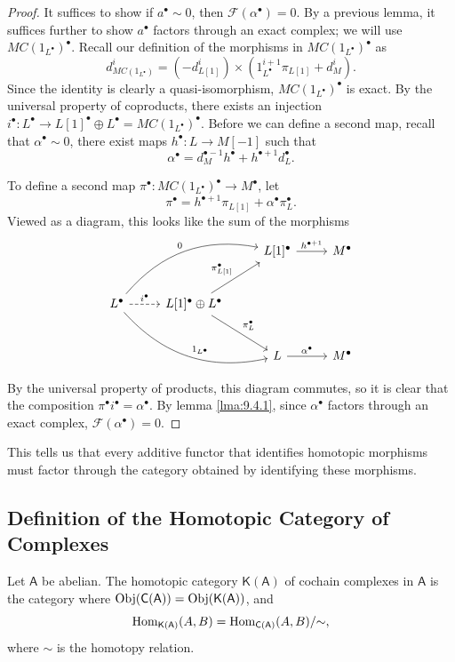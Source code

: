 \begin{proof}
	It suffices to show if $a^{\bullet} \sim 0$, then $\mathscr{F} (\alpha ^{\bullet} )=0$. By a previous lemma, it suffices further to show $a^{\bullet} $ factors through an exact complex; we will use $MC(1_{L^{\bullet} })^{\bullet} $. Recall our definition of the morphisms in $MC(1_{L^{\bullet} } )^{\bullet} $ as
	\[
		d_{MC(1_{L^{\bullet} } )} ^i=\left( -d^i_{L[1]}  \right) \times \left( 1^{i+1}_{L^{\bullet} } \pi_{L[1]} +d_M^i \right) 
	.\]
	Since the identity is clearly a quasi-isomorphism, $MC(1_{L^{\bullet} } )^{\bullet} $ is exact. By the universal property of coproducts, there exists an injection $i^{\bullet} :L^{\bullet} \to L[1]^{\bullet} \oplus L^{\bullet} =MC(1_{L^{\bullet} } )^{\bullet} $. Before we can define a second map, recall that $\alpha^{\bullet} \sim 0 $, there exist maps $h^{\bullet} : L \to M[-1]$ such that
	\[
		\alpha^{\bullet} =d_{M}^{\bullet-1}h^{\bullet} +h^{\bullet+1}d_L^{\bullet}   
	.\]

	To define a second map $\pi ^{\bullet} : MC(1_{L^{\bullet} } )^{\bullet} \to M^{\bullet} $, let
	\[
		\pi^{\bullet} =h^{\bullet+1} \pi_{L[1]} +\alpha ^{\bullet} \pi_{L} ^{\bullet} 
	.\]
	Viewed as a diagram, this looks like the sum of the morphisms
	\[\begin{tikzcd}[row sep = 2.5em, column sep = 2.5em]
		&&L[1]^{\bullet} \ar[r, "h^{\bullet+1} "]&M^{\bullet} \\
		L^{\bullet} \ar[r, dashed, "i^{\bullet} "]\ar[urr, bend left, "0"]\ar[drr, bend right, "1_{L^{\bullet} } "]&L[1]^{\bullet} \oplus L^{\bullet} \ar[ur, "\pi_{L\text{[} 1\text{]} }^{\bullet}  "]\ar[dr, "\pi_L^{\bullet} "]\\
		&&L\ar[r, "\alpha ^{\bullet} "]&M^{\bullet} 
	\end{tikzcd}\]
	By the universal property of products, this diagram commutes, so it is clear that the composition $\pi ^{\bullet} i^{\bullet}=\alpha ^{\bullet} $. By lemma \ref{lma:9.4.1}, since $\alpha ^{\bullet} $ factors through an exact complex, $\mathscr{F} (\alpha ^{\bullet} )=0$.
\end{proof}

This tells us that every additive functor that identifies homotopic morphisms must factor through the category obtained by identifying these morphisms.

\subsection{Definition of the Homotopic Category of Complexes}
\begin{definition}\label{dfn:5.5.1}
	Let $\mathsf{A} $ be abelian. The homotopic category $\mathsf{K} (\mathsf{A} )$ of cochain complexes in $\mathsf{A} $ is the category where $\operatorname{Obj}(\mathsf{C} (\mathsf{A} )) =\operatorname{Obj}(\mathsf{K} (\mathsf{A} )) $, and
	\[
		\operatorname{Hom}_{\mathsf{K} (\mathsf{A} )}(A, B) =\operatorname{Hom}_{\mathsf{C} (\mathsf{A} )}(A, B) /\mathbin{\sim} 
	,\]
	where $\sim $ is the homotopy relation.
\end{definition}


